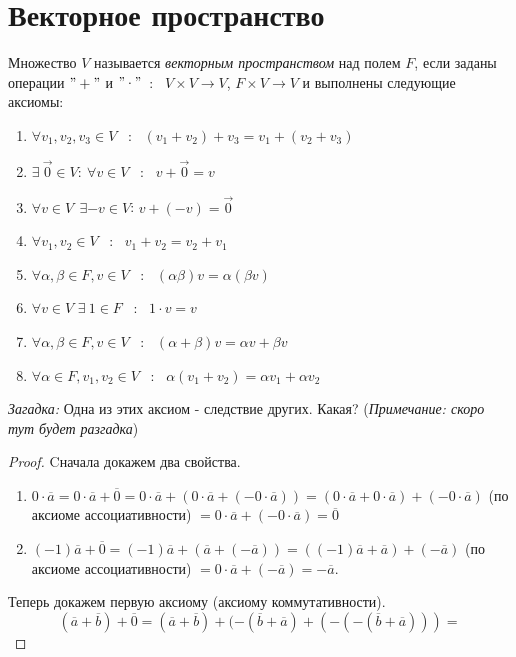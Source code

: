 \section{Векторное пространство}
  \begin{definition}
    Множество $V$ называется \textit{векторным пространством} над полем $F$, если заданы операции $"+"$ и $"\cdot"$\ : \ $V\times V \to V$, $F \times V \to V$ и выполнены следующие аксиомы:
    \begin{enumerate}
        \item $\forall v_1, v_2, v_3\in V$ \ : \ $(v_1 + v_2) + v_3 = v_1 + (v_2 + v_3)$
        \item $\exists \ \vec 0 \in V:\ \forall v \in V$ \ : \ $v + \vec 0 = v$
        \item $\forall v \in V \ \ \exists  -v  \in V$: $v + (-v) = \vec 0$
        \item $\forall v_1, v_2 \in V$ \ : \ $v_1 + v_2 = v_2 + v_1$
        \item $\forall \alpha, \beta \in F, v \in V$ \ : \ $(\alpha \beta)v = \alpha (\beta v)$
        \item $\forall v \in V$ $\exists \ 1 \in F$ \ : \ $1 \cdot v = v$
        \item $\forall \alpha, \beta \in F, v \in V$ \ : \ $(\alpha + \beta)v = \alpha v + \beta v$
        \item $\forall \alpha \in F, v_1, v_2 \in V$ \ : \ $\alpha (v_1 + v_2) = \alpha v_1 + \alpha v_2$
    \end{enumerate}
    \textit{Загадка:} Одна из этих аксиом - следствие других. Какая?
    (\textit{Примечание: скоро тут будет разгадка})
    \begin{proof}
      Cначала докажем два свойства.
      \begin{enumerate}
        \item $0\cdot\overline{a} = 0\cdot\overline{a}+\overline{0} = 0\cdot\overline{a}+(0\cdot\overline{a}+(-0\cdot\overline{a})) = (0\cdot\overline{a}+0\cdot\overline{a}) + (-0\cdot\overline{a})$ (по аксиоме ассоциативности) $= 0\cdot\overline{a}+(-0\cdot\overline{a}) = \overline{0}$
        \item $(-1)\overline{a}+\overline{0} = (-1)\overline{a}+(\overline{a}+(-\overline{a})) = ((-1)\overline{a}+\overline{a})+(-\overline{a})$ (по аксиоме ассоциативности) $= 0\cdot\overline{a}+(-\overline{a}) = -\overline{a}$.
      \end{enumerate}
      Теперь докажем первую аксиому (аксиому коммутативности).
      $$(\overline{a}+\overline{b})+\overline{0} = (\overline{a}+\overline{b})+(-(\overline{b}+\overline{a})+(-(-(\overline{b}+\overline{a}))) = $$

\end{proof}
\end{definition}
